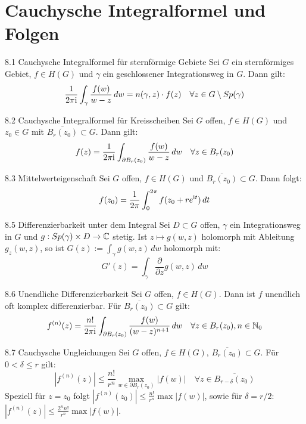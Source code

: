 \section{Cauchysche Integralformel und Folgen}

\begin{satz}{8.1 Cauchysche Integralformel für sternförmige Gebiete}
Sei $G$ ein sternförmiges Gebiet, $f \in H(G)$ und $\gamma$ ein geschlossener Integrationsweg in $G$. Dann gilt:
\[
    \frac{1}{2\pi\mathrm{i}} \int_\gamma \frac{f(w)}{w-z} \, dw = n(\gamma, z) \cdot f(z) \quad \forall z \in G \setminus Sp(\gamma)
\]
\end{satz}

\begin{satz}{8.2 Cauchysche Integralformel für Kreisscheiben}
Sei $G$ offen, $f \in H(G)$ und $z_0 \in G$ mit $\overline{B_r(z_0)} \subset G$. Dann gilt:
\[
    f(z) = \frac{1}{2\pi\mathrm{i}} \int_{\partial B_r(z_0)} \frac{f(w)}{w-z} \, dw \quad \forall z \in B_r(z_0)
\]
\end{satz}

\begin{satz}{8.3 Mittelwerteigenschaft}
Sei $G$ offen, $f \in H(G)$ und $\overline{B_r(z_0)} \subset G$. Dann folgt:
\[
    f(z_0) = \frac{1}{2\pi} \int_0^{2\pi} f(z_0 + re^{\mathrm{i} t}) \, dt
\]
\end{satz}

\begin{satz}{8.5 Differenzierbarkeit unter dem Integral}
Sei $D \subset G$ offen, $\gamma$ ein Integrationsweg in $G$ und $g: Sp(\gamma) \times D \to \mathbb{C}$ stetig. Ist $z \mapsto g(w, z)$ holomorph mit Ableitung $g_z(w, z)$, so ist $G(z) := \int_\gamma g(w, z) \, dw$ holomorph mit:
\[
    G'(z) = \int_\gamma \frac{\partial}{\partial z} g(w, z) \, dw
\]
\end{satz}

\begin{satz}{8.6 Unendliche Differenzierbarkeit}
Sei $G$ offen, $f \in H(G)$. Dann ist $f$ unendlich oft komplex differenzierbar. Für $\overline{B_r(z_0)} \subset G$ gilt:
\[
    f^{(n)}(z) = \frac{n!}{2\pi\mathrm{i}} \int_{\partial B_r(z_0)} \frac{f(w)}{(w-z)^{n+1}} \, dw \quad \forall z \in B_r(z_0), n \in \mathbb{N}_0
\]
\end{satz}

\begin{satz}{8.7 Cauchysche Ungleichungen}
Sei $G$ offen, $f \in H(G)$, $\overline{B_r(z_0)} \subset G$. Für $0 < \delta \le r$ gilt:
\[
    |f^{(n)}(z)| \le \frac{n!}{r^n} \max_{w \in \partial B_r(z_0)} |f(w)| \quad \forall z \in \overline{B_{r-\delta}(z_0)}
\]
Speziell für $z=z_0$ folgt $|f^{(n)}(z_0)| \le \frac{n!}{r^n} \max |f(w)|$, sowie für $\delta = r/2$: $|f^{(n)}(z)| \le \frac{2^n n!}{r^n} \max |f(w)|$.
\end{satz}